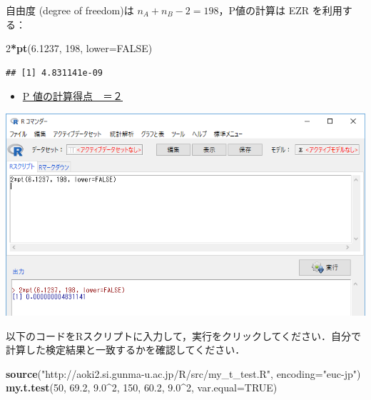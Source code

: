\documentclass[]{problemset}
\newenvironment{Shaded}{\begin{snugshade}}{\end{snugshade}}
\newcommand{\DataTypeTok}[1]{\textcolor[rgb]{0.13,0.29,0.53}{#1}}
\newcommand{\DecValTok}[1]{\textcolor[rgb]{0.00,0.00,0.81}{#1}}
\newcommand{\FloatTok}[1]{\textcolor[rgb]{0.00,0.00,0.81}{#1}}
\newcommand{\KeywordTok}[1]{\textcolor[rgb]{0.13,0.29,0.53}{\textbf{#1}}}
\newcommand{\NormalTok}[1]{#1}
\newcommand{\OperatorTok}[1]{\textcolor[rgb]{0.81,0.36,0.00}{\textbf{#1}}}
\newcommand{\OtherTok}[1]{\textcolor[rgb]{0.56,0.35,0.01}{#1}}
\newcommand{\StringTok}[1]{\textcolor[rgb]{0.31,0.60,0.02}{#1}}
\begin{document}
自由度 (degree of freedom)は \(n_A + n_B -2 = 198\)，P値の計算は EZR
を利用する：

\begin{Shaded}
\begin{Highlighting}[]
\DecValTok{2}\OperatorTok{*}\KeywordTok{pt}\NormalTok{(}\FloatTok{6.1237}\NormalTok{, }\DecValTok{198}\NormalTok{, }\DataTypeTok{lower=}\OtherTok{FALSE}\NormalTok{)}
\end{Highlighting}
\end{Shaded}

\begin{verbatim}
## [1] 4.831141e-09
\end{verbatim}

\begin{itemize}
\item
  \underline{P 値の計算得点　＝２}
\end{itemize}

\begin{center}\includegraphics[width=0.9\linewidth]{pic/tvaluepvalue00} \end{center}

以下のコードをRスクリプトに入力して，実行をクリックしてください．自分で計算した検定結果と一致するかを確認してください．

\begin{Shaded}
\begin{Highlighting}[]
\KeywordTok{source}\NormalTok{(}\StringTok{"http://aoki2.si.gunma-u.ac.jp/R/src/my_t_test.R"}\NormalTok{, }\DataTypeTok{encoding=}\StringTok{"euc-jp"}\NormalTok{)}
\KeywordTok{my.t.test}\NormalTok{(}\DecValTok{50}\NormalTok{, }\FloatTok{69.2}\NormalTok{, }\FloatTok{9.0}\OperatorTok{^}\DecValTok{2}\NormalTok{, }\DecValTok{150}\NormalTok{, }\FloatTok{60.2}\NormalTok{, }\FloatTok{9.0}\OperatorTok{^}\DecValTok{2}\NormalTok{, }\DataTypeTok{var.equal=}\OtherTok{TRUE}\NormalTok{)}
\end{Highlighting}
\end{Shaded}
\end{document}
